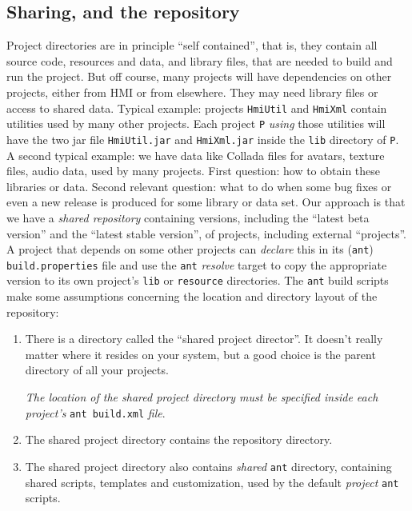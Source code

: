 \subsection{Sharing, and the repository}
Project directories are in principle ``self contained'', that is, they contain all source code, resources and data,
and library files, that are needed to build and run the project. 
But off course, many projects will have dependencies on other projects, either from HMI or from elsewhere.
They may need library files or access to shared data. 
Typical example: projects \verb#HmiUtil# and \verb#HmiXml# contain utilities used by many other projects. 
Each project \verb#P# \emph{using} those utilities will have the two jar file \verb#HmiUtil.jar# and
\verb#HmiXml.jar# inside the \verb#lib# directory of  \verb#P#. 
A second typical example: we have data like Collada files for avatars, texture files, audio data, used by many projects. 
First question: how to obtain these libraries or data.
Second relevant question: what to do when
some bug fixes or even a new release is produced for some library or data set.
Our approach is that we have a \emph{shared repository} containing versions, including the ``latest beta version''
and the ``latest stable version'', of projects, including external ``projects''. 
A project that depends on some other projects can \emph{declare} this in its (\verb#ant#) \verb#build.properties# file
 and use the \verb#ant# \emph{resolve} target to copy the appropriate version to its own project's \verb#lib#
 or \verb#resource# directories. 
 The \verb#ant# build scripts make some assumptions concerning the location and directory layout
 of the repository:
 \begin{enumerate}
 \item There is a directory called the ``shared project director''.
 It doesn't really matter where it resides on your system, but a good choice is the
 parent directory of all your projects. 

 \emph{The location of the shared project directory must be specified inside each project's }\verb#ant build.xml# \emph{file}.
 \item The shared project directory contains the repository directory.
 \item The shared project directory also contains \emph{shared} \verb#ant# directory, containing shared scripts, templates and customization, used by the default \emph{project} \verb#ant# scripts. 
 \end{enumerate}